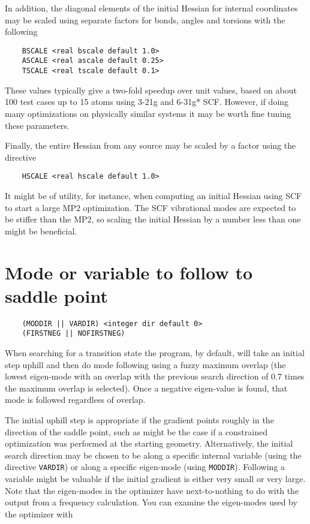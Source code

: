 In addition, the diagonal elements of the initial Hessian for
internal coordinates may be scaled using separate factors for
bonds, angles and torsions with the following
\begin{verbatim}
    BSCALE <real bscale default 1.0>
    ASCALE <real ascale default 0.25>
    TSCALE <real tscale default 0.1>
\end{verbatim}
These values typically give a two-fold speedup over unit values, based
on about 100 test cases up to 15 atoms using 3-21g and 6-31g* SCF.
However, if doing many optimizations on physically similar systems it
may be worth fine tuning these parameters.

Finally, the entire Hessian from any source may be scaled
by a factor using the directive
\begin{verbatim}
    HSCALE <real hscale default 1.0>
\end{verbatim}
It might be of utility, for instance, when computing an initial
Hessian using SCF to start a large MP2 optimization.  The SCF
vibrational modes are expected to be stiffer than the MP2, so scaling
the initial Hessian by a number less than one might be beneficial.


\section{Mode or variable to follow to saddle point}

\begin{verbatim}
    (MODDIR || VARDIR) <integer dir default 0>
    (FIRSTNEG || NOFIRSTNEG)
\end{verbatim}

When searching for a transition state the program, by default,
will take an initial step uphill and then do mode following
using a fuzzy maximum overlap (the lowest eigen-mode with an
overlap with the previous search direction of 0.7 times the
maximum overlap is selected).  Once a negative eigen-value
is found, that mode is followed regardless of overlap.

The initial uphill step is appropriate if the gradient points roughly
in the direction of the saddle point, such as might be the case if a
constrained optimization was performed at the starting geometry.
Alternatively, the initial search direction may be chosen to be along
a specific internal variable (using the directive
\verb+VARDIR+) or along a specific eigen-mode (using \verb+MODDIR+).
Following a variable might be valuable if the initial gradient is
either very small or very large.  Note that the eigen-modes in the
optimizer have next-to-nothing to do with the output from a frequency
calculation.  You can examine the eigen-modes used by the optimizer
with

